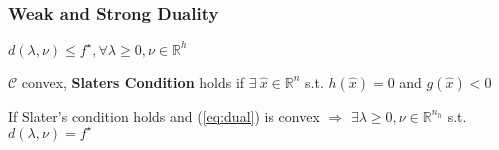 


\subsubsection{Weak and Strong Duality}

\begin{proposition}
	$d(\lambda,\nu)\le f^\star,\forall\lambda\ge0,\nu\in\mathbb{R}^{h}$
\end{proposition}

\begin{definition}
	$\mathcal{C}$ convex, \textbf{Slaters Condition} holds if
	$\exists\ \hat{x} \in \mathbb{R}^{n}$ s.t. $h(\hat{x})=0$ and $g(\hat{x})<0$
\end{definition}

\begin{proposition}
	If Slater's condition holds
	and (\ref{eq:dual}) is convex
	$\Rightarrow$
	$\exists \lambda \ge 0, \nu \in \mathbb{R}^{n_h}$ s.t. $d(\lambda,\nu)=f^\star$
\end{proposition}



